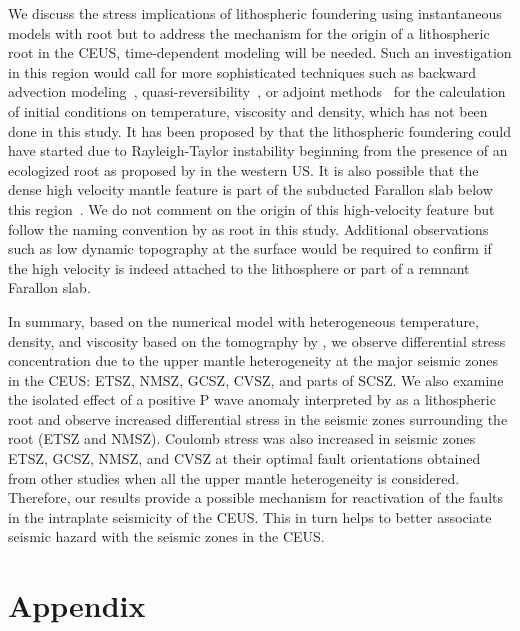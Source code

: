 \documentclass[draft,linenumbers]{agujournal2018}
\begin{document}
    
    We discuss the stress implications of lithospheric foundering using instantaneous models with root but to address the mechanism for the origin of a lithospheric root in the CEUS, time-dependent modeling will be needed. Such an investigation in this region would call for more sophisticated techniques such as backward advection modeling~\citep[e.g.,][]{conrad2003seismic}, quasi-reversibility~\citep{glivsovic2016new}, or adjoint methods~\citep[e.g.,][]{bunge2003mantle, liu2008reconstructing} for the calculation of initial conditions on temperature, viscosity and density, which has not been done in this study. It has been proposed by \citep{Biryol_2016} that the lithospheric foundering could have started due to Rayleigh-Taylor instability beginning from the presence of an ecologized root as proposed by \citet{le2006mantle} in the western US. It is also possible that the dense high velocity mantle feature is part of the subducted Farallon slab below this region~\citep{schmandt2010seismic}. We do not comment on the origin of this high-velocity feature but follow the naming convention by \citet{Biryol_2016} as root in this study. Additional observations such as low dynamic topography at the surface would be required to confirm if the high velocity is indeed attached to the lithosphere or part of a remnant Farallon slab.
    
    In summary, based on the numerical model with heterogeneous temperature, density, and viscosity based on the tomography by \citet{Biryol_2016}, we observe differential stress concentration due to the upper mantle heterogeneity at the major seismic zones in the CEUS: ETSZ, NMSZ, GCSZ, CVSZ, and parts of SCSZ. We also examine the isolated effect of a positive P wave anomaly interpreted by \citet{Biryol_2016} as a lithospheric root and observe increased differential stress in the seismic zones surrounding the root (ETSZ and NMSZ). Coulomb stress was also increased in seismic zones ETSZ, GCSZ, NMSZ, and CVSZ at their optimal fault orientations obtained from other studies when all the upper mantle heterogeneity is considered. Therefore, our results provide a possible mechanism for reactivation of the faults in the intraplate seismicity of the CEUS. This in turn helps to better associate seismic hazard with the seismic zones in the CEUS.
    
\appendix
\section{Appendix}
\end{document}
